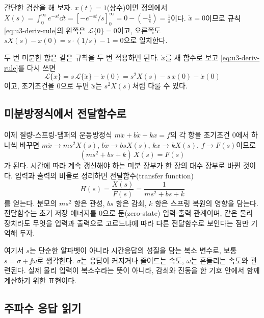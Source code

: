 간단한 검산을 해 보자.
$x(t)=1$(상수)이면 정의에서
$X(s)=\int_0^\infty e^{-st}\dd t
=\left[-e^{-st}/s\right]_0^\infty
=0-\left(-\tfrac{1}{s}\right)=\tfrac{1}{s}$이다.
$\dot{x}=0$이므로 규칙 \eqref{eq:u3-deriv-rule}의 왼쪽은
$\mathcal{L}\{0\}=0$이고, 오른쪽도
$sX(s)-x(0)=s\cdot(1/s)-1=0$으로 일치한다.

두 번 미분한 항은 같은 규칙을 두 번 적용하면 된다.
$\dot{x}$를 새 함수로 보고 \eqref{eq:u3-deriv-rule}를 다시 쓰면
\begin{equation}
  \mathcal{L}\{\ddot{x}\}
  = s\,\mathcal{L}\{\dot{x}\} - \dot{x}(0)
  = s^2 X(s) - s\,x(0) - \dot{x}(0)
\end{equation}
이고, 초기조건을 0으로 두면 $\ddot{x}$는 $s^2 X(s)$처럼 다룰 수 있다.

\subsection{미분방정식에서 전달함수로}

이제 질량-스프링-댐퍼의 운동방정식 $m\ddot{x}+b\dot{x}+kx=f$의 각 항을
초기조건 0에서 하나씩 바꾸면
$m\ddot{x}\to m s^2 X(s)$, $b\dot{x}\to b s X(s)$, $kx\to kX(s)$,
$f\to F(s)$이므로
\begin{equation}
  (m s^2 + b s + k)\,X(s) = F(s)
\end{equation}
가 된다.
시간에 따라 계속 갱신해야 하는 미분 장부가 한 장의 대수 장부로 바뀐 것이다.
입력과 출력의 비율로 정리하면 전달함수(transfer function)
\begin{equation}
  H(s) = \frac{X(s)}{F(s)} = \frac{1}{m s^2 + b s + k}
  \label{eq:u3-msd-tf}
\end{equation}
를 얻는다.
분모의 $ms^2$ 항은 관성, $bs$ 항은 감쇠, $k$ 항은 스프링 복원의 영향을 담는다.
전달함수는 초기 저장 에너지를 0으로 둔(zero-state) 입력-출력 관계이며,
같은 물리 장치라도 무엇을 입력과 출력으로 고르느냐에 따라 다른 전달함수로
보인다는 점만 기억해 두자.

여기서 $s$는 단순한 알파벳이 아니라 시간응답의 성질을 담는 복소 변수로,
보통 $s=\sigma+\jj\omega$로 생각한다.
$\sigma$는 응답이 커지거나 줄어드는 속도, $\omega$는 흔들리는 속도와
관련된다.
실제 물리 입력이 복소수라는 뜻이 아니라, 감쇠와 진동을 한 기호 안에서 함께
계산하기 위한 표현이다.

\subsection{주파수 응답 읽기}

